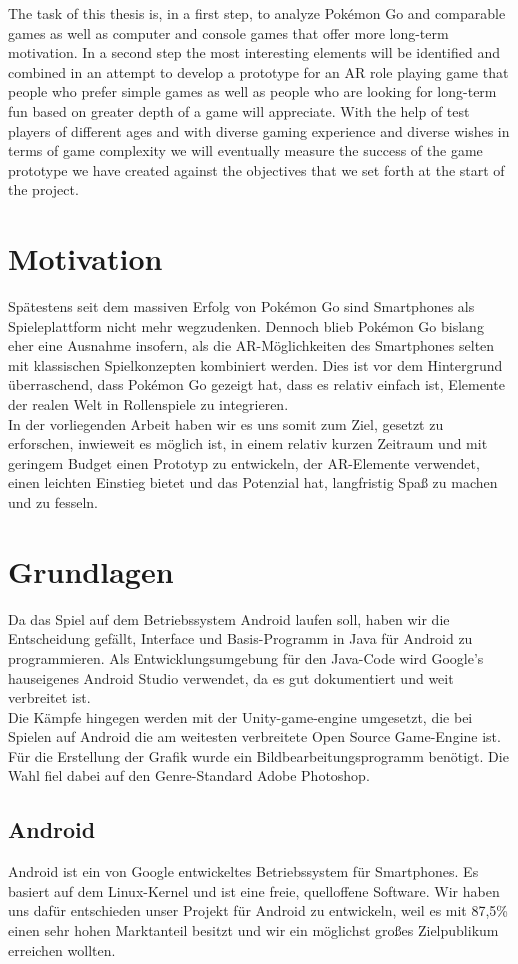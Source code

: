 \documentclass[extern,palatino]{cgBA}
\begin{document}
The task of this thesis is, in a first step, to analyze Pokémon Go and comparable games as well as computer and console games that offer more long-term motivation. In a second step the most interesting elements will be identified and combined in an attempt to develop a prototype for an AR role playing game that people who prefer simple games as well as people who are looking for long-term fun based on greater depth of a game will appreciate. With the help of test players of different ages and with diverse gaming experience and diverse wishes in terms of game complexity we will eventually measure the success of the game prototype we have created against the objectives that we set forth at the start of the project.
\newpage
\section{Motivation}
Spätestens seit dem massiven Erfolg von Pokémon Go sind Smartphones als Spieleplattform nicht mehr wegzudenken. Dennoch blieb Pokémon Go bislang eher eine Ausnahme insofern, als die AR-Möglichkeiten des Smartphones selten mit klassischen Spielkonzepten kombiniert werden. Dies ist vor dem Hintergrund überraschend, dass Pokémon Go gezeigt hat, dass es relativ einfach ist, Elemente der realen Welt in Rollenspiele zu integrieren. 
\\In der vorliegenden Arbeit haben wir es uns somit zum Ziel, gesetzt zu erforschen, inwieweit es möglich ist, in einem relativ kurzen Zeitraum und mit geringem Budget einen Prototyp zu entwickeln, der AR-Elemente verwendet, einen leichten Einstieg bietet und das Potenzial hat, langfristig Spaß zu machen und zu fesseln.
\newpage
\section{Grundlagen}
Da das Spiel auf dem Betriebssystem Android laufen soll, haben wir die Entscheidung gefällt, Interface und Basis-Programm in Java für Android zu programmieren. Als Entwicklungsumgebung für den Java-Code wird Google's hauseigenes Android Studio verwendet, da es gut dokumentiert und weit verbreitet ist.
\\Die Kämpfe hingegen werden mit der Unity-game-engine umgesetzt, die bei Spielen auf Android die am weitesten verbreitete Open Source Game-Engine ist. Für die Erstellung der Grafik wurde ein Bildbearbeitungsprogramm benötigt. Die Wahl fiel dabei auf den Genre-Standard Adobe Photoshop.
\subsection{Android}
Android ist ein von Google entwickeltes Betriebssystem für Smartphones. Es basiert auf dem Linux-Kernel und ist eine freie, quelloffene Software. Wir haben uns dafür entschieden unser Projekt für Android zu entwickeln, weil es mit 87,5\% \cite{and0} einen sehr hohen Marktanteil besitzt und wir ein möglichst großes Zielpublikum erreichen wollten. 
\end{document}
